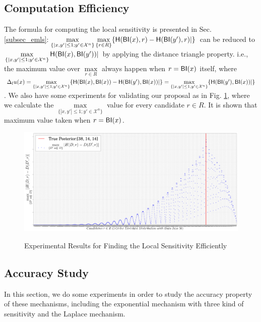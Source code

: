 \subsection{Computation Efficiency}
The formula for computing the local sensitivity is presented in Sec. \ref{subsec_emls}:$\max\limits_{\{|x,y'| \leq 1; y'\in \mathcal{X}^n\}}\max\limits_{\{r\in R\}} \{\mathsf{H}(\mathsf{BI}(x), r) - \mathsf{H}(\mathsf{BI}(y'), r)|\}$ can be reduced to $\max\limits_{\{|x,y'| \leq 1;y'\in \mathcal{X}^n\}}\mathsf{H}(\mathsf{BI}(x), \mathsf{BI}(y'))|$ by applying the distance triangle property. i.e., the maximum value over $\max\limits_{r \in R}$ always happen when $r = \mathsf{BI}(x)$ itself, where $\Delta_{l}u(x) = \max\limits_{\{|x,y'| \leq 1;y'\in \mathcal{X}^n\}} \{\mathsf{H}(\mathsf{BI}(x), \mathsf{BI}(x)) - \mathsf{H}(\mathsf{BI}(y'), \mathsf{BI}(x))|\} = \max\limits_{\{|x,y'| \leq 1;y'\in \mathcal{X}^n\}} \{\mathsf{H}(\mathsf{BI}(y'), \mathsf{BI}(x))|\}$. We also have some experiments for validating our proposal as in Fig. \ref{fig_efficiency}, where we calculate the $\max\limits_{\{|x,y'| \leq 1;y'\in \mathcal{X}^n\}}$ value for every candidate $r \in R$. It is shown that maximum value taken when  $r = \mathsf{BI}(x)$.

 \begin{figure}[h]
\centering
\includegraphics[width=1.0\textwidth]{efficiency}
\label{fig_efficiency}
\caption{Experimental Results for Finding the Local Sensitivity Efficiently}
\end{figure}

\subsection{Accuracy Study}
In this section, we do some experiments in order to study the accuracy property of these mechanisms, including the exponential mechanism with three kind of sensitivity and the Laplace mechanism.


